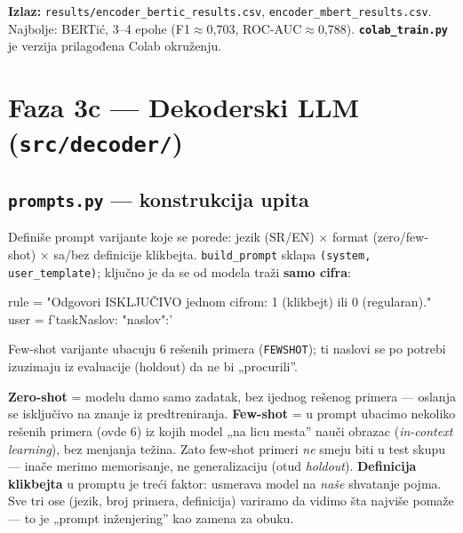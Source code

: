 \documentclass[11pt,a4paper]{article}
\newcommand{\fajl}[1]{\textbf{\texttt{#1}}}
\newcommand{\kod}[1]{\texttt{#1}}
\begin{document}
\textbf{Izlaz:} \kod{results/encoder\_bertic\_results.csv},
\kod{encoder\_mbert\_results.csv}. Najbolje: BERTić, 3--4 epohe (F1$\approx$0,703,
ROC-AUC$\approx$0,788). \fajl{colab\_train.py} je verzija prilagođena Colab okruženju.

\section{Faza 3c --- Dekoderski LLM (\texttt{src/decoder/})}

\subsection{\texttt{prompts.py} --- konstrukcija upita}
Definiše prompt varijante koje se porede: jezik (SR/EN) $\times$ format
(zero/few-shot) $\times$ sa/bez definicije klikbejta. \kod{build\_prompt} sklapa
\kod{(system, user\_template)}; ključno je da se od modela traži \textbf{samo cifra}:
\begin{code}
rule = "Odgovori ISKLJUČIVO jednom cifrom: 1 (klikbejt) ili 0 (regularan)."
user = f'{task}\n{}Naslov: "{{naslov}}"\nOdgovor:'
\end{code}
Few-shot varijante ubacuju 6 rešenih primera (\kod{FEWSHOT}); ti naslovi se po potrebi
izuzimaju iz evaluacije (holdout) da ne bi „procurili''.

\begin{teorija}
\textbf{Zero-shot} = modelu damo samo zadatak, bez ijednog rešenog primera --- oslanja
se isključivo na znanje iz predtreniranja. \textbf{Few-shot} = u prompt ubacimo
nekoliko rešenih primera (ovde 6) iz kojih model „na licu mesta'' nauči obrazac
(\emph{in-context learning}), bez menjanja težina. Zato few-shot primeri \emph{ne} smeju
biti u test skupu --- inače merimo memorisanje, ne generalizaciju (otud \emph{holdout}).
\textbf{Definicija klikbejta} u promptu je treći faktor: usmerava model na \emph{naše}
shvatanje pojma. Sve tri ose (jezik, broj primera, definicija) variramo da vidimo šta
najviše pomaže --- to je „prompt inženjering'' kao zamena za obuku.
\end{teorija}
\end{document}
